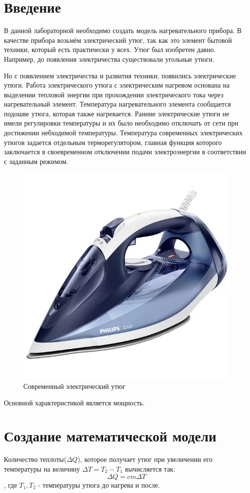 \documentclass[a4paper, 14pt]{extarticle}
\begin{document}
	\pagebreak	

	\section{Введение}
		В данной лабораторной необходимо создать модель нагревательного прибора. В качестве прибора возьмём электрический утюг, так как это элемент бытовой техники, который есть практически у всех. Утюг был изобретен давно. Например, до появления электричества существовали угольные утюги.	
		
 		Но с появлением электричества и развития техники, появились электрические утюги. Работа электрического утюга с электрическим нагревом основана на выделении тепловой энергии при прохождении электрического тока через нагревательный элемент. Температура нагревательного элемента сообщается подошве утюга, которая также нагревается. Ранние электрические утюги не имели регулировки температуры и их было необходимо отключать от сети при достижении небходимой температуры. Температура современных электрических утюгов задается отдельным терморегулятором, главная функция которого заключается в своевременном отключении подачи электроэнергии в соответствии с заданным режимом.
		
		\begin{figure}[H]
			\centering
			\includegraphics[width = .5\linewidth]{utug.jpg}
			\caption[.] {Современный электрический утюг}
		\end{figure}
	
		Основной характеристикой является мощность.

	\section{Создание математической модели}
		Количество теплоты(\(\Delta Q\)), которое получает утюг при увеличении его температуры на величину 
		\( \Delta T = T_2 - T_1 \) вычисляется так:
		\[ \Delta Q = cm \Delta T \], где \( T_1, T_2\) - температуры утюга до нагрева и после.
		
\end{document}
